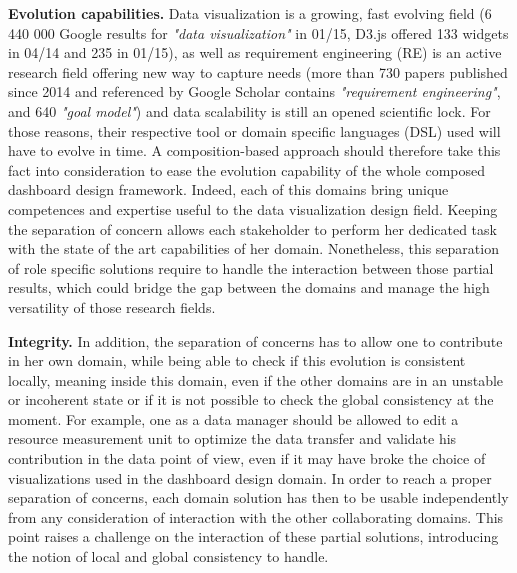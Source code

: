 \documentclass{acm_proc_article-sp}
\begin{document}
\textbf{Evolution capabilities.}
Data visualization is a growing, fast evolving field
(6 440 000 Google results for \emph{"data visualization"} in 01/15,
D3.js offered 133 widgets in 04/14 and 235 in 01/15),
as well as requirement engineering (RE) is an active research field
offering new way to capture needs (more than 730 papers published
since 2014 and referenced by Google Scholar contains
\emph{"requirement engineering"}, and 640 \emph{"goal model"})
and data scalability is still an opened scientific lock.
For those reasons, their respective tool or domain
specific languages (DSL) used will have to evolve in time.
A composition-based approach should therefore take this fact
into consideration to ease the evolution
capability of the whole composed dashboard design framework.
Indeed, each of this domains bring unique competences and expertise
useful to the data visualization design field. Keeping the separation
of concern allows each stakeholder to perform her dedicated task with
the state of the art capabilities of her domain.
Nonetheless, this separation of role specific solutions require to 
handle the interaction between those partial results,
which could bridge the gap between the domains and
manage the high versatility of those research fields.

\textbf{Integrity.}
In addition, the separation of concerns has to allow one to contribute
in her own domain, while being able to check if this evolution is
consistent locally, meaning inside this domain, even if the other domains
are in an unstable or incoherent state or if it is not possible to check
the global consistency at the moment. For example, one as a data manager
should be allowed to edit a resource measurement unit to optimize the data
transfer and validate his contribution in the data point of view,
even if it may have broke the choice of visualizations used in the
dashboard design domain.
In order to reach a proper separation of concerns, each domain solution 
has then to be usable independently from any consideration of interaction
with the other collaborating domains.
This point raises a challenge on the interaction of these partial solutions,
introducing the notion of local and global consistency to handle.
\end{document}

